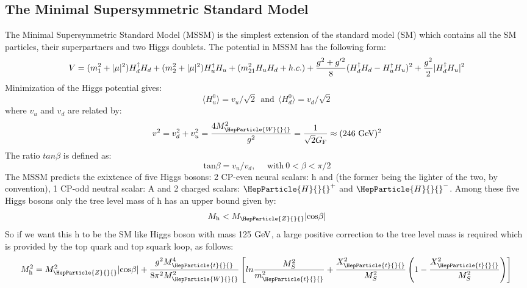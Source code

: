 \documentclass[11.5pt, a4paper]{article}
\newcommand{\GeV}{\ensuremath{\text{Ge\hspace{-.08em}V}}{}\xspace}
\DeclareRobustCommand{\PW}{{\HepParticle{W}{}{}}\xspace}
\DeclareRobustCommand{\PH}{{\HepParticle{H}{}{}}\xspace}
\DeclareRobustCommand{\PZ}{{\HepParticle{Z}{}{}}\xspace}
\DeclareRobustCommand{\PQt}{\HepParticle{t}{}{}} %
\begin{document}
\subsection{The Minimal Supersymmetric Standard Model}\label{MSSM}
The Minimal Supersymmetric Standard Model (MSSM) is the simplest extension of the standard model (SM) which contains all the SM particles, their superpartners and two Higgs doublets. The potential in MSSM has the following form:
\begin{equation}
	V = (m^{2}_{1} + |\mu|^{2})H_{d}^{\dagger} H_{d} + (m_{2}^{2} + |\mu|^{2})H_{u}^{\dagger}H_{u} + (m_{21}^{2}H_{u}H_{d} + h.c.)\\
	 + \frac{g^{2}+g^{\prime 2}}{8}(H_{d}^{\dagger}H_{d} - H_{u}^{\dagger}H_{u})^{2} + \frac{g^{2}}{2}|H_{d}^{\dagger}H_{u}|^{2}
\end{equation}
Minimization of the Higgs potential gives:
\begin{equation}
\langle H_{u}^{0}\rangle =v_{u}/\sqrt{2}~~\text{and}~~\langle H_{d}^{0}\rangle=v_{d}/\sqrt{2} 
\end{equation}
where $v_{u}$ and $v_{d}$ are related by:
\begin{equation}
	v^{2}=v_{d}^{2}+v_{u}^{2}=\frac{4M_{\PW}^{2}}{g^{2}}=\frac{1}{\sqrt{2}G_{\text{F}}}\approx(246~\GeV)^{2}
\end{equation}
The ratio $tan\beta$ is defined as:
\begin{equation}
	\text{tan}\beta=v_{u}/v_{d},~~~~~~\text{with}~ 0<\beta<\pi/2
\end{equation}
The MSSM predicts the exixtence of five Higgs bosons: 2 CP-even neural scalars: h and \PH (the former being the lighter of the two, by convention), 1 CP-odd neutral scalar: A and 2 charged scalars: $\PH^{+}$ and $\PH^{-}$. Among these five Higgs bosons only the tree level mass of h has an upper bound given by:
\begin{equation}
	M_{\text{h}}<M_{\PZ}|\text{cos}\beta|
\end{equation}
So if we want this h to be the SM like Higgs boson with mass 125 \GeV, a large positive correction to the tree level mass is required which is provided by the top quark and top squark loop, as follows:
\begin{equation}
	M_{\text{h}}^{2}=M_{\PZ}^{2}|\text{cos}{\beta}|+\frac{g^{2}M_{\PQt}^{4}}{8\pi^{2}M_{\PW}^{2}}\left[ln\frac{M_{S}^{2}}{m_{\PQt}^{2}}+\frac{X_{\PQt}^{2}}{M_{S}^{2}}\left(1-\frac{X_{\PQt}^{2}}{M_{S}^{2}}\right)\right]\\
\end{equation}
\end{document}
